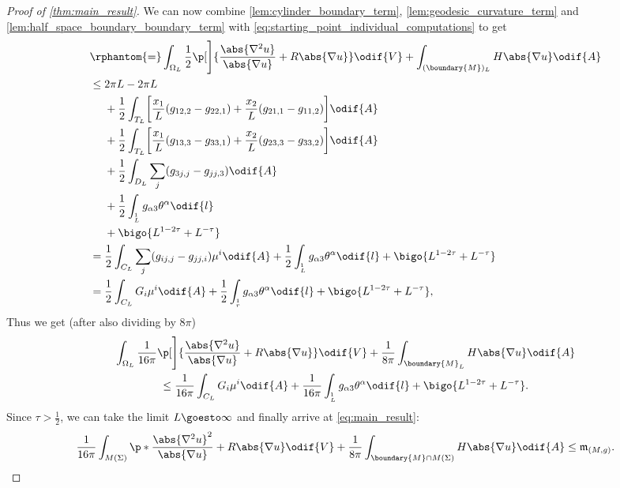 \documentclass[titlepage,numbers=noenddot,oneside,%
cleardoublepage=empty,paper=a4,fontsize=11pt,%
english,%
]{scrartcl}
\let\sphere\relax
\newcommand{\sphere}{\mathbb{S}}
\newcommand{\mass}[2]{\mathfrak{m}_{(#1,#2)}} %
\begin{document}
\begin{proof}[Proof of \cref{thm:main_result}]
    We can now combine \cref{lem:cylinder_boundary_term}, \cref{lem:geodesic_curvature_term} and \cref{lem:half_space_boundary_boundary_term} with \cref{eq:starting_point_individual_computations}
     to get
    \begin{equation*}
        \begin{aligned}[t]
            &\rphantom{=}\int_{\Omega_L} \frac{1}{2}\p[\Bigg]{\frac{\abs{\nabla^2 u}}{\abs{\nabla u}}+R\abs{\nabla u} }\odif{V}+\int_{(\boundary{M})_L} H\abs{\nabla u}\odif{A}\\
            & \leq \begin{aligned}[t]
                &2\pi L- 2\pi L\\
                &+\frac{1}{2}\int_{T_L}\biggl[\frac{x_1}{L}(g_{12,2}-g_{22,1})+\frac{x_2}{L}(g_{21,1}-g_{11,2})\biggr]\odif{A}\\
                &+\frac{1}{2}\int_{T_L}\biggl[\frac{x_1}{L}(g_{13,3}-g_{33,1})+\frac{x_2}{L}(g_{23,3}-g_{33,2})\biggr]\odif{A}\\
                &+\frac{1}{2}\int_{D_L}\sum_{j}(g_{3j,j}-g_{jj,3})\odif{A}\\
                &
                +\frac{1}{2}\int_{\sphere^1_L}g_{\alpha 3}\theta^\alpha\odif{l}\\
                &+\bigo{L^{1-2\tau}+L^{-\tau}}
            \end{aligned}\\
            &=\frac{1}{2}\int_{C_L}\sum_{j}(g_{ij,j}-g_{jj,i})\mu^i\odif{A}+\frac{1}{2}\int_{\sphere^1_L}g_{\alpha 3}\theta^\alpha\odif{l}+\bigo{L^{1-2\tau}+L^{-\tau}}\\
            &=\frac{1}{2}\int_{C_L}G_i\mu^i\odif{A}+\frac{1}{2}\int_{\sphere_r^{1}}g_{\alpha 3}\theta^\alpha\odif{l}+\bigo{L^{1-2\tau}+L^{-\tau}},
        \end{aligned}
    \end{equation*}
    Thus we get (after also dividing by \( 8\pi \))
    \begin{multline*}
        \int_{\Omega_L} \frac{1}{16\pi}\p[\Bigg]{\frac{\abs{\nabla^2 u}}{\abs{\nabla u}}+R \abs{\nabla u}}\odif{V}+\frac{1}{8\pi}\int_{\boundary{M}_L}H\abs{\nabla u}\odif{A}\\
        \leq \frac{1}{16\pi}\int_{C_L}G_i\mu^i\odif{A}+\frac{1}{16\pi}\int_{\sphere^1_L}g_{\alpha3}\theta^\alpha\odif{l}+\bigo{L^{1-2\tau}+L^{-\tau}}.
    \end{multline*}
    Since \( \tau>\frac{1}{2} \), we can take the limit \( L\goesto \infty \) and finally arrive at \cref{eq:main_result}:
    \begin{equation}
        \frac{1}{16\pi}\int_{M(\Sigma)}\p*{\frac{\abs{\nabla^2 u}^2}{\abs{\nabla u}}+R\abs{\nabla u}}\odif{V}+\frac{1}{8\pi}\int_{\boundary{M}\cap M(\Sigma)}H \abs{\nabla u}\odif{A}\leq \mass{M}{g}.\label{eq:final_statement_main_result}
    \end{equation}
\end{proof}
\end{document}
